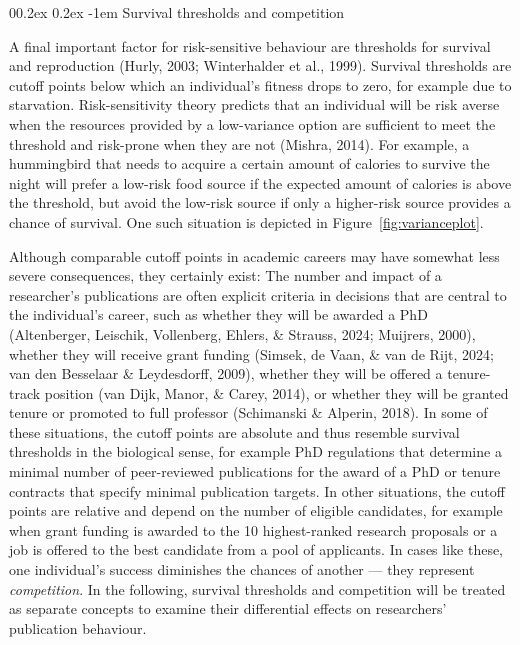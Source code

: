 \documentclass[
  ,man,mask,floatsintext]{apa6}
\makeatletter
\let\oldparagraph\paragraph
\renewcommand{\paragraph}[1]{\oldparagraph{#1}\mbox{}}
\renewcommand{\paragraph}{\@startsection{paragraph}{4}{\parindent}%
  {0\baselineskip \@plus 0.2ex \@minus 0.2ex}%
  {-1em}%
  {\normalfont\normalsize\bfseries\itshape\typesectitle}}
\makeatother
\begin{document}
\hypertarget{survival-thresholds-and-competition}{%
\paragraph{Survival thresholds and competition}\label{survival-thresholds-and-competition}}

A final important factor for risk-sensitive behaviour are thresholds for survival and reproduction (Hurly, 2003; Winterhalder et al., 1999).
Survival thresholds are cutoff points below which an individual's fitness drops to zero, for example due to starvation.
Risk-sensitivity theory predicts that an individual will be risk averse when the resources provided by a low-variance option are sufficient to meet the threshold and risk-prone when they are not (Mishra, 2014).
For example, a hummingbird that needs to acquire a certain amount of calories to survive the night will prefer a low-risk food source if the expected amount of calories is above the threshold, but avoid the low-risk source if only a higher-risk source provides a chance of survival.
One such situation is depicted in Figure~\ref{fig:varianceplot}.

Although comparable cutoff points in academic careers may have somewhat less severe consequences, they certainly exist:
The number and impact of a researcher's publications are often explicit criteria in decisions that are central to the individual's career, such as whether they will be awarded a PhD (Altenberger, Leischik, Vollenberg, Ehlers, \& Strauss, 2024; Muijrers, 2000), whether they will receive grant funding (Simsek, de Vaan, \& van de Rijt, 2024; van den Besselaar \& Leydesdorff, 2009), whether they will be offered a tenure-track position (van Dijk, Manor, \& Carey, 2014), or whether they will be granted tenure or promoted to full professor (Schimanski \& Alperin, 2018).
In some of these situations, the cutoff points are absolute and thus resemble survival thresholds in the biological sense, for example PhD regulations that determine a minimal number of peer-reviewed publications for the award of a PhD or tenure contracts that specify minimal publication targets.
In other situations, the cutoff points are relative and depend on the number of eligible candidates, for example when grant funding is awarded to the 10 highest-ranked research proposals or a job is offered to the best candidate from a pool of applicants.
In cases like these, one individual's success diminishes the chances of another --- they represent \emph{competition}.
In the following, survival thresholds and competition will be treated as separate concepts to examine their differential effects on researchers' publication behaviour.
\end{document}
